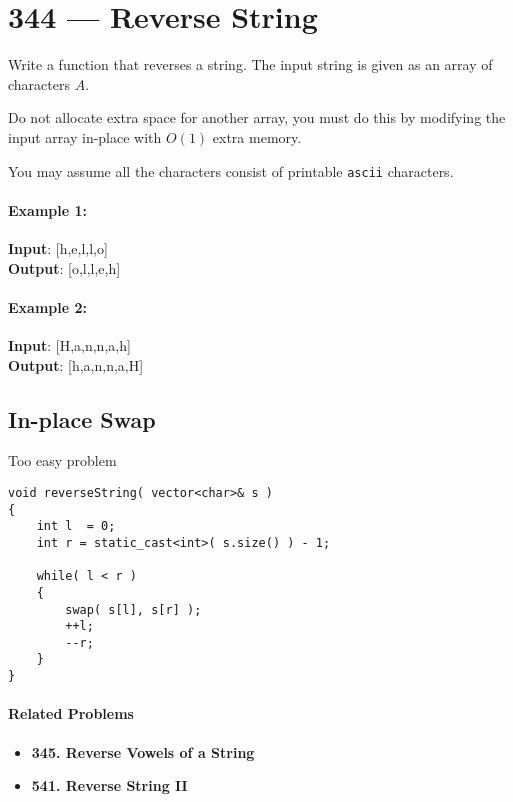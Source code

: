 \section{344 --- Reverse String}
Write a function that reverses a string. The input string is given as an array of characters $A$.
\par
Do not allocate extra space for another array, you must do this by modifying the input array in-place with $O(1)$ extra memory.
\par
You may assume all the characters consist of printable \texttt{ascii} characters.

 

\paragraph{Example 1:}

\begin{flushleft}
\textbf{Input}: [h,\quad e,\quad l,\quad l,\quad o]
\\
\textbf{Output}: [o,\quad l,\quad l,\quad e,\quad h]
\end{flushleft}

\paragraph{Example 2:}

\begin{flushleft}
\textbf{Input}: [H,\quad a,\quad n,\quad n,\quad a,\quad h]
\\
\textbf{Output}: [h,\quad a,\quad n,\quad n,\quad a,\quad H]
\end{flushleft}

\subsection{In-place Swap}
Too easy problem

\setcounter{lstlisting}{0}
\begin{lstlisting}[style=customc, caption={In-place Swap}]
void reverseString( vector<char>& s )
{
    int l  = 0;
    int r = static_cast<int>( s.size() ) - 1;

    while( l < r )
    {
        swap( s[l], s[r] );
        ++l;
        --r;
    }
}
\end{lstlisting}

\paragraph{Related Problems}
\begin{itemize}
\item \textbf{345. Reverse Vowels of a String}
\item \textbf{541. Reverse String II}
\end{itemize}